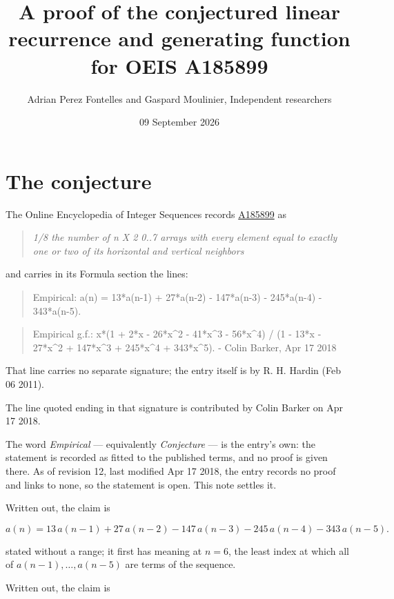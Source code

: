 \documentclass[11pt]{article}
\title{A proof of the conjectured linear recurrence and generating function for OEIS A185899}
\author{Adrian Perez Fontelles and Gaspard Moulinier, Independent researchers}
\date{09 September 2026}
\theoremstyle{definition}
\begin{document}
\maketitle
\section{The conjecture}

The Online Encyclopedia of Integer Sequences records \href{https://oeis.org/A185899}{A185899} as

\begin{quote}\itshape 1/8 the number of n X 2 0..7 arrays with every element equal to exactly one or two of its horizontal and vertical neighbors\end{quote}

and carries in its Formula section the lines:

\begin{quote}\ttfamily Empirical: a(n) = 13*a(n-1) + 27*a(n-2) - 147*a(n-3) - 245*a(n-4) - 343*a(n-5).\end{quote}

\begin{quote}\ttfamily Empirical g.f.: x*(1 + 2*x - 26*x\textasciicircum{}2 - 41*x\textasciicircum{}3 - 56*x\textasciicircum{}4) / (1 - 13*x - 27*x\textasciicircum{}2 + 147*x\textasciicircum{}3 + 245*x\textasciicircum{}4 + 343*x\textasciicircum{}5). - Colin Barker, Apr 17 2018\end{quote}

That line carries no separate signature; the entry itself is by R. H. Hardin (Feb 06 2011).

The line quoted ending in that signature is contributed by Colin Barker on Apr 17 2018.

The word {\itshape Empirical} --- equivalently {\itshape Conjecture} --- is the entry's own: the statement is recorded as fitted to the published terms, and no proof is given there. As of revision 12, last modified Apr 17 2018, the entry records no proof and links to none, so the statement is open. This note settles it.

Written out, the claim is

\[a(n) = 13\,a(n-1) + 27\,a(n-2) - 147\,a(n-3) - 245\,a(n-4) - 343\,a(n-5).\]

stated without a range; it first has meaning at $n = 6$, the least index at which all of $a(n-1),\dots,a(n-5)$ are terms of the sequence.

Written out, the claim is
\end{document}
